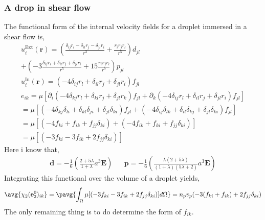 \subsubsection{A drop in shear flow}

The functional form of the internal velocity fields for a droplet immersed in a shear flow is,
\begin{align*}
    u_i^\text{Ext}(\textbf{r})
    = \left(\frac{\delta_{ij} r_l - \delta_{il} r_j - \delta_{jl} r_i}{r^3} 
    + \frac{r_ir_jr_l}{r^5}\right)  d_{jl}\\
    + \left(-3 \frac{\delta_{ij} r_l + \delta_{il} r_j + \delta_{jl} r_i}{r^5} 
    + 15\frac{r_ir_jr_l}{r^7}\right)  p_{jl}\\
    u_i^\text{In}(\textbf{r})
    = \left(- 4 \delta_{ij} r_l  + \delta_{il} r_j + \delta_{jl} r_i\right) f_{jl}\\
    e_{ik}
    = \mu [
        \partial_i \left(- 4 \delta_{kj} r_l  + \delta_{kl} r_j + \delta_{jl} r_k\right) f_{jl} + \partial_k \left(- 4 \delta_{ij} r_l  + \delta_{il} r_j + \delta_{jl} r_i\right) f_{jl} 
    ]\\
    = \mu [
        \left(- 4 \delta_{kj} \delta_{li}  + \delta_{kl} \delta_{ji} + \delta_{jl} \delta_{ki}\right) f_{jl} + \left(- 4 \delta_{ij} \delta_{lk}  + \delta_{il} \delta_{kj} + \delta_{jl} \delta_{ki}\right) f_{jl} 
    ]\\
    = \mu [
        \left(- 4 f_{ki}  + f_{ik} + f_{jj}\delta_{ki}\right)  + \left(- 4 f_{ik}  + f_{ki} + f_{jj} \delta_{ki}\right)  
    ]\\
    = \mu [
        \left(- 3 f_{ki}  - 3 f_{ik} +2 f_{jj}\delta_{ki}\right) 
    ]
\end{align*}
Here i know that, 
\begin{align*}
    \textbf{d}
    = - \frac{1}{6} \left(
        \frac{2+5\lambda}{1+\lambda}a^3 \textbf{E}
    \right)
    &&
    \textbf{p}
    = - \frac{1}{6} \left(
        \frac{\lambda(2+5\lambda)}{(1+\lambda)(5\lambda+2)}a^3 \textbf{E}
    \right)
\end{align*}
Integrating this functional over the volume of a droplet yields, 
\begin{equation}
    \avg{\chi_2 (\textbf{e}_2^0)_{ik}}
    = \pavg{\int_{\Omega} 
        \mu [
        \left(- 3 f_{ki}  - 3 f_{ik} +2 f_{jj}\delta_{ki}\right) 
    ] d\Omega}
    = n_pv_p(-3 (f_{ki}+ f_{ik}) + 2 f_{jj} \delta_{ki})
\end{equation}
The only remaining thing is to do determine the form of $f_{ik}$. 



